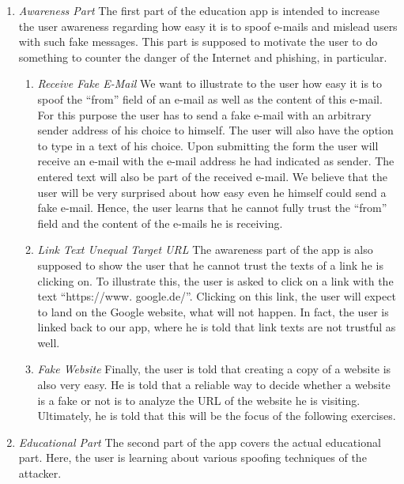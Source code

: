 \begin{enumerate}
	\item \textit{Awareness Part} The first part of the education app is intended to increase the user awareness regarding how easy it is to spoof e-mails and mislead users with such fake messages.
 This part is supposed to motivate the user to do something to counter the danger of the Internet and phishing, in particular.

\begin{enumerate}
		\item \textit{Receive Fake E-Mail} We want to illustrate to the user how easy it is to spoof the ``from'' field of an e-mail as well as the content of this e-mail.
 For this purpose the user has to send a fake e-mail with an arbitrary sender address of his choice to himself.
 The user will also have the option to type in a text of his choice.
 Upon submitting the form the user will receive an e-mail with the e-mail address he had indicated as sender.
 The entered text will also be part of the received e-mail.
 We believe that the user will be very surprised about how easy even he himself could send a fake e-mail.
Hence, the user learns that he cannot fully trust the ``from'' field and the content of the e-mails he is receiving.

		\item \textit{Link Text Unequal Target URL} The awareness part of the app is also supposed to show the user that he cannot trust the texts of a link he is clicking on.
 To illustrate this, the user is asked to click on a link with the text ``https://www.
google.de/''. Clicking on this link, the user will expect to land on the Google website, what will not happen.
 In fact, the user is linked back to our app, where he is told that link texts are not trustful as well.
 
	\item \textit{Fake Website} Finally, the user is told that creating a copy of a website is also very easy.
 He is told that a reliable way to decide whether a website is a fake or not is to analyze the URL of the website he is visiting.
Ultimately, he is told that this will be the focus of the following exercises.

\end{enumerate}
	\item \textit{Educational Part} The second part of the app covers the actual educational part.
 Here, the user is learning about various spoofing techniques of the attacker.


\end{enumerate}
